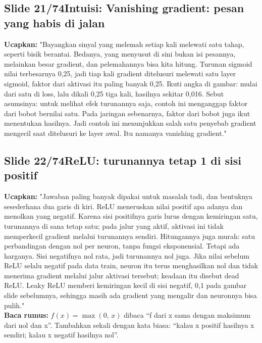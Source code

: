 \documentclass[11pt]{article}
\renewcommand{\framebox}[1]{\colorbox{acc!15}{\textcolor{acc}{\textbf{#1}}}}
\begin{document}
\subsection*{\framebox{Slide 21/74}\quad Intuisi: Vanishing gradient: pesan yang habis di jalan}
\textbf{Ucapkan:} "Bayangkan sinyal yang melemah setiap kali melewati satu tahap, seperti bisik berantai. Bedanya, yang menyusut di sini bukan isi pesannya, melainkan besar gradient, dan pelemahannya bisa kita hitung. Turunan sigmoid nilai terbesarnya 0,25, jadi tiap kali gradient ditelusuri melewati satu layer sigmoid, faktor dari aktivasi itu paling banyak 0,25. Ikuti angka di gambar: mulai dari satu di loss, lalu dikali 0,25 tiga kali, hasilnya sekitar 0,016. Sebut asumsinya: untuk melihat efek turunannya saja, contoh ini menganggap faktor dari bobot bernilai satu. Pada jaringan sebenarnya, faktor dari bobot juga ikut menentukan hasilnya. Jadi contoh ini menunjukkan salah satu penyebab gradient mengecil saat ditelusuri ke layer awal. Itu namanya vanishing gradient."\\[2pt]

\subsection*{\framebox{Slide 22/74}\quad ReLU: turunannya tetap 1 di sisi positif}
\textbf{Ucapkan:} "Jawaban paling banyak dipakai untuk masalah tadi, dan bentuknya sesederhana dua garis di kiri. ReLU meneruskan nilai positif apa adanya dan menolkan yang negatif. Karena sisi positifnya garis lurus dengan kemiringan satu, turunannya di sana tetap satu; pada jalur yang aktif, aktivasi ini tidak memperkecil gradient melalui turunannya sendiri. Hitungannya juga murah: satu perbandingan dengan nol per neuron, tanpa fungsi eksponensial. Tetapi ada harganya. Sisi negatifnya nol rata, jadi turunannya nol juga. Jika nilai sebelum ReLU selalu negatif pada data train, neuron itu terus menghasilkan nol dan tidak menerima gradient melalui jalur aktivasi tersebut; keadaan itu disebut dead ReLU. Leaky ReLU memberi kemiringan kecil di sisi negatif, 0,1 pada gambar slide sebelumnya, sehingga masih ada gradient yang mengalir dan neuronnya bisa pulih."\\[2pt]
\textbf{Baca rumus:} $f(x)=\max(0,\,x)$ dibaca ``f dari x sama dengan maksimum dari nol dan x''. Tambahkan sekali dengan kata biasa: ``kalau x positif hasilnya x sendiri; kalau x negatif hasilnya nol''.\\[2pt]
\end{document}
